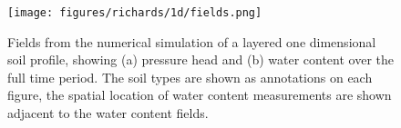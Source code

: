 \begin{figure}[!htbp]
\begin{center}
\texttt{[image: figures/richards/1d/fields.png]}
\end{center}
\caption{
Fields from the numerical simulation of a layered one dimensional soil profile,
showing (a) pressure head and (b) water content over the full time period.
The soil types are shown as annotations on each figure, the spatial location of water content measurements
are shown adjacent to the water content fields.
}
\label{fig:richards-1d-fields}
\end{figure}
